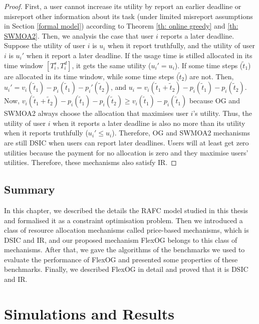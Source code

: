 \documentclass[11pt]{phdthesis}
\begin{document}
\begin{proof}
    First, a user cannot increase its utility by report an earlier deadline or misreport other information about its task (under limited misreport assumptions in Section \ref{formal model}) according to Theorem \ref{th: online greedy} and \ref{th: SWMOA2}. Then, we analysis the case that user $ i $ reports a later deadline. Suppose the utility of user $ i $ is $ u_i $ when it report truthfully, and the utility of user $ i $ is $ u_i' $ when it report a later deadline. If the usage time is stilled allocated in its time window $ [T_i^s, T_i^d] $, it gets the same utility ($ u_i' = u_i $). If some time steps ($ \tilde{t}_1 $) are allocated in its time window, while some time steps ($ \tilde{t}_2 $) are not. Then, $ u_i' = v_i(\tilde{t}_1) - p_i(\tilde{t}_1) -  p_i'(\tilde{t}_2)$, and $ u_i = v_i(\tilde{t}_1 + \tilde{t}_2) - p_i(\tilde{t}_1) -  p_i(\tilde{t}_2) $. Now, $ v_i(\tilde{t}_1 + \tilde{t}_2) - p_i(\tilde{t}_1) - p_i(\tilde{t}_2) \geq v_i(\tilde{t}_1) - p_i(\tilde{t}_1) $ because OG and SWMOA2 always choose the allocation that maximises user $ i $'s utility. Thus, the utility of user $ i $ when it reports a later deadline is also no more than its utility when it reports truthfully ($ u_i' \leq u_i $). Therefore, OG and SWMOA2 mechanisms are still DSIC when users can report later deadlines. Users will at least get zero utilities because the payment for no allocation is zero and they maximise users' utilities. Therefore, these mechanisms also satisfy IR.
\end{proof}




\section{Summary} \label{mechansims summary}

In this chapter, we described the details the RAFC model studied in this thesis and formalised it as a constraint optimisation problem. Then we introduced a class of resource allocation mechanisms called price-based mechanisms, which is DSIC and IR, and our proposed mechanism FlexOG belongs to this class of mechanisms. After that, we gave the algorithms of the benchmarks we used to evaluate the performance of FlexOG and presented some properties of these benchmarks. Finally, we described FlexOG in detail and proved that it is DSIC and IR. 



\chapter{Simulations and Results} \label{simulation and results}
\end{document}
